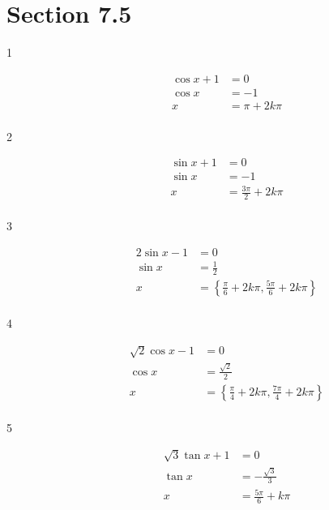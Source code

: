 \documentclass{exam}
\begin{document}
    \pagebreak

    \section{Section 7.5}
    \begin{description}

      \item[1] 
        \begin{align*}
          \cos x + 1 & = 0 \\
          \cos x     & = -1 \\
          x          & = \boxed{ \pi + 2 k \pi } \\
        \end{align*}

      \item[2] 
        \begin{align*}
          \sin x + 1 & = 0 \\
          \sin x     & = -1 \\
          x          & = \boxed{ \frac{3 \pi}{2} + 2 k \pi } \\
        \end{align*}

      \item[3] 
        \begin{align*}
          2 \sin x - 1 & = 0 \\
          \sin x       & = \frac{1}{2} \\
          x            & = \boxed{ \left\{ \frac{\pi}{6} + 2 k \pi, \frac{5 \pi}{6} + 2 k \pi \right\} } \\
        \end{align*}

      \item[4] 
        \begin{align*}
          \sqrt{2} \cos x - 1 & = 0 \\
          \cos x              & = \frac{\sqrt{2}}{2} \\
          x                   & = \boxed{ \left\{ \frac{\pi}{4} + 2 k \pi, \frac{7 \pi}{4} + 2 k \pi \right\} } \\
        \end{align*}

      \item[5] 
        \begin{align*}
          \sqrt{3} \tan x + 1 & = 0 \\
          \tan x              & = - \frac{\sqrt{3}}{3} \\
          x                   & = \boxed{ \frac{5 \pi}{6} + k \pi } \\
        \end{align*}


\end{description}
\end{document}
